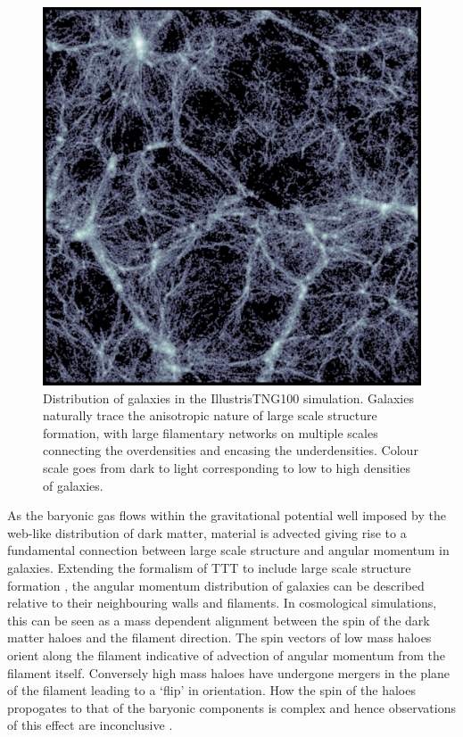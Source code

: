 \begin{figure}
	\includegraphics[width=\linewidth]{thesis/latex/intro_files/slice_image_bone.pdf}
    \caption{Distribution of galaxies in the IllustrisTNG100 simulation. Galaxies naturally trace the anisotropic nature of large scale structure formation, with large filamentary networks on multiple scales connecting the overdensities and encasing the underdensities. Colour scale goes from dark to light corresponding to low to high densities of galaxies.}
    \label{fig:cosmo_web_tng}
\end{figure}

As the baryonic gas flows within the gravitational potential well imposed by the web-like distribution of dark matter, material is advected giving rise to a fundamental connection between large scale structure and angular momentum in galaxies. Extending the formalism of TTT to include large scale structure formation \citep[e.g.][]{pichon2011,codis2015, laigle2015}, the angular momentum distribution of galaxies can be described relative to their neighbouring walls and filaments. In cosmological simulations, this can be seen as a mass dependent alignment between the spin of the dark matter haloes and the filament direction. The spin vectors of low mass haloes orient along the filament indicative of advection of angular momentum from the filament itself. Conversely high mass haloes have undergone mergers in the plane of the filament leading to a `flip' in orientation. How the spin of the haloes propogates to that of the baryonic components is complex and hence observations of this effect are inconclusive \citep[e.g.][]{tempel2013, krolewski2019, welker2020}. 

